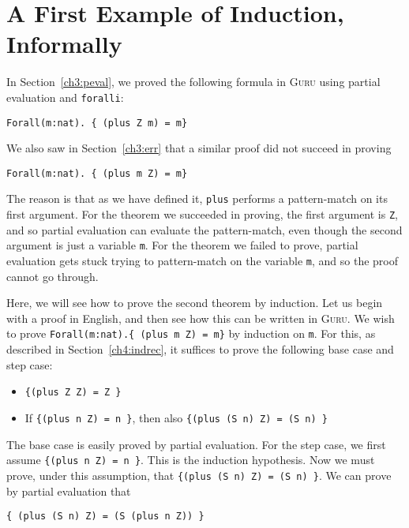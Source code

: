 \documentclass{book}[12pt]
\newcommand{\guru}[0]{\textsc{Guru}\xspace}
\begin{document}
\section{A First Example of Induction, Informally}
\label{ch4:indinf}

In Section~\ref{ch3:peval}, we proved the following formula in \guru
using partial evaluation and \texttt{foralli}:

\begin{verbatim}
Forall(m:nat). { (plus Z m) = m}
\end{verbatim}

\noindent We also saw in Section~\ref{ch3:err} that a similar proof
did not succeed in proving 

\begin{verbatim}
Forall(m:nat). { (plus m Z) = m}
\end{verbatim}

\noindent The reason is that as we have defined it, \texttt{plus}
performs a pattern-match on its first argument.  For the theorem we
succeeded in proving, the first argument is \texttt{Z}, and so partial
evaluation can evaluate the pattern-match, even though the second
argument is just a variable \texttt{m}.  For the theorem we failed to
prove, partial evaluation gets stuck trying to pattern-match on the
variable \texttt{m}, and so the proof cannot go through.

Here, we will see how to prove the second theorem by induction.  Let us
begin with a proof in English, and then see how this can be written in
\guru.  We wish to prove \texttt{Forall(m:nat).\{ (plus m Z) = m\}} by
induction on \texttt{m}.  For this, as described in Section~\ref{ch4:indrec},
it suffices to prove the following base case and step case:

\begin{itemize}
\item \texttt{\{(plus Z Z) = Z \}}
\item If \texttt{\{(plus n Z) = n \}}, then also \texttt{\{(plus (S n) Z) = (S n) \}}
\end{itemize}

\noindent The base case is easily proved by partial evaluation.  For
the step case, we first assume \texttt{\{(plus n Z) = n \}}.  This is
the induction hypothesis.  Now we must prove, under this assumption,
that \texttt{\{(plus (S n) Z) = (S n) \}}.  We can prove by partial
evaluation that

\begin{verbatim}
{ (plus (S n) Z) = (S (plus n Z)) }
\end{verbatim}
\end{document}
